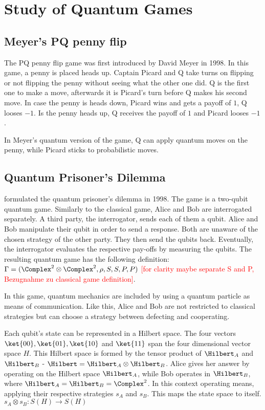 \chapter{Study of Quantum Games}

\section{Meyer's PQ penny flip}
The PQ penny flip game was first introduced by David Meyer in 1998. In this game, a penny is placed heads up. Captain Picard and Q take turns on flipping or not flipping the penny without seeing what the other one did. Q is the first one to make a move, afterwards it is Picard's turn before Q makes his second move. In case the penny is heads down, Picard wins and gets a payoff of $1$, Q looses $-1$. Is the penny heads up, Q receives the payoff of $1$ and Picard looses $-1$.

In Meyer's quantum version of the game, Q can apply quantum moves on the penny, while Picard sticks to probabilistic moves.

\section{Quantum Prisoner's Dilemma}\label{Eisert}
\citeauthor{Eisert00} formulated the quantum prisoner's dilemma in 1998. The game is a two-qubit quantum game.
Similarly to the classical game, Alice and Bob are interrogated separately. A third party, the interrogator, sends each of them a qubit. Alice and Bob manipulate their qubit in order to send a response. Both are unaware of the chosen strategy of the other party. They then send the qubits back. Eventually, the interrogator evaluates the respective pay-offs by measuring the qubits. The resulting quantum game has the following definition: $\Gamma=(\Complex^2\otimes\Complex^2, \rho,S,S,P,P)$ \textcolor{red}{[for clarity maybe separate S and P, Bezugnahme zu classical game definition]}.

In this game, quantum mechanics are included by using a quantum particle as means of communication. Like this, Alice and Bob are not restricted to classical strategies but can choose a strategy between defecting and cooperating.

Each qubit's state can be represented in a Hilbert space. The four vectors $\ket{00}, \ket{01}, \ket{10}$ and $\ket{11}$ span the four dimensional vector space $H$. This Hilbert space is formed by the tensor product of $\Hilbert_A$ and $\Hilbert_B$ - $\Hilbert=\Hilbert_A\otimes\Hilbert_B$. Alice gives her answer by operating on the Hilbert space $\Hilbert_A$, while Bob operates in $\Hilbert_B$, where $\Hilbert_A=\Hilbert_B=\Complex^2$. In this context operating means, applying their respective strategies $s_A$ and $s_B$. This maps the state space to itself. $s_A \otimes s_B:S(H) \to S(H)$

